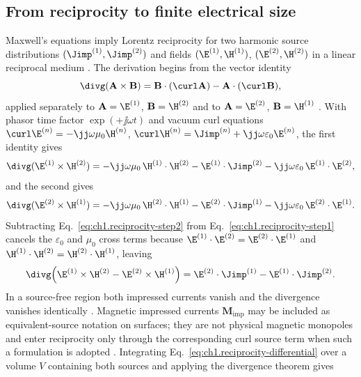 \subsection{From reciprocity to finite electrical size}
\label{sec:ch01.5.4}

Maxwell's equations imply Lorentz reciprocity for two harmonic source distributions $(\Jimp^{(1)},\Jimp^{(2)})$ and fields $(\E^{(1)},\H^{(1)})$, $(\E^{(2)},\H^{(2)})$ in a linear reciprocal medium \cite{stratton1941,harrington2001}. The derivation begins from the vector identity
\begin{equation}
\label{eq:ch1.vector-cross-div}
\divg(\mathbf{A}\times\mathbf{B})
=\mathbf{B}\cdot(\curl\mathbf{A})-\mathbf{A}\cdot(\curl\mathbf{B}),
\end{equation}
applied separately to $\mathbf{A}=\E^{(1)}$, $\mathbf{B}=\H^{(2)}$ and to $\mathbf{A}=\E^{(2)}$, $\mathbf{B}=\H^{(1)}$ \cite{stratton1941}. With phasor time factor $\exp(+\jj\omega t)$ and vacuum curl equations
$\curl\E^{(n)}=-\jj\omega\mu_0\H^{(n)}$,
$\curl\H^{(n)}=\Jimp^{(n)}+\jj\omega\varepsilon_0\E^{(n)}$,
the first identity gives
\begin{equation}
\label{eq:ch1.reciprocity-step1}
\divg(\E^{(1)}\times\H^{(2)})
=-\jj\omega\mu_0\,\H^{(1)}\cdot\H^{(2)}
-\E^{(1)}\cdot\Jimp^{(2)}
-\jj\omega\varepsilon_0\,\E^{(1)}\cdot\E^{(2)},
\end{equation}
and the second gives
\begin{equation}
\label{eq:ch1.reciprocity-step2}
\divg(\E^{(2)}\times\H^{(1)})
=-\jj\omega\mu_0\,\H^{(2)}\cdot\H^{(1)}
-\E^{(2)}\cdot\Jimp^{(1)}
-\jj\omega\varepsilon_0\,\E^{(2)}\cdot\E^{(1)}.
\end{equation}
Subtracting Eq.~\eqref{eq:ch1.reciprocity-step2} from Eq.~\eqref{eq:ch1.reciprocity-step1} cancels the $\varepsilon_0$ and $\mu_0$ cross terms because $\E^{(1)}\cdot\E^{(2)}=\E^{(2)}\cdot\E^{(1)}$ and $\H^{(1)}\cdot\H^{(2)}=\H^{(2)}\cdot\H^{(1)}$, leaving
\begin{equation}
\label{eq:ch1.reciprocity-differential}
\divg\!\left(\E^{(1)}\times\H^{(2)}-\E^{(2)}\times\H^{(1)}\right)
=\E^{(2)}\cdot\Jimp^{(1)}-\E^{(1)}\cdot\Jimp^{(2)}.
\end{equation}
In a source-free region both impressed currents vanish and the divergence vanishes identically \cite{stratton1941}. Magnetic impressed currents $\mathbf{M}_{\mathrm{imp}}$ may be included as equivalent-source notation on surfaces; they are not physical magnetic monopoles and enter reciprocity only through the corresponding curl source term when such a formulation is adopted \cite{schelkunoff1943,harrington2001}. Integrating Eq.~\eqref{eq:ch1.reciprocity-differential} over a volume $V$ containing both sources and applying the divergence theorem gives
